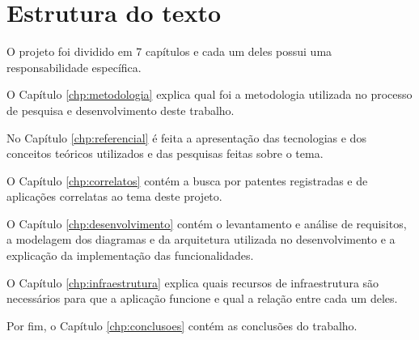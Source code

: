 \section{Estrutura do texto}\label{sec:estrutura}

O projeto foi dividido em 7 capítulos e cada um deles possui uma responsabilidade específica.

O Capítulo \ref{chp:metodologia} explica qual foi a metodologia utilizada no processo de pesquisa e desenvolvimento deste trabalho.

No Capítulo \ref{chp:referencial} é feita a apresentação das tecnologias e dos conceitos teóricos utilizados e das pesquisas feitas sobre o tema.

O Capítulo \ref{chp:correlatos} contém a busca por patentes registradas e de aplicações correlatas ao tema deste projeto.

O Capítulo \ref{chp:desenvolvimento} contém o levantamento e análise de requisitos, a modelagem dos diagramas e da arquitetura utilizada no desenvolvimento e a explicação da implementação das funcionalidades.

O Capítulo \ref{chp:infraestrutura} explica quais recursos de infraestrutura são necessários para que a aplicação funcione e qual a relação entre cada um deles.

Por fim, o Capítulo \ref{chp:conclusoes} contém as conclusões do trabalho.






